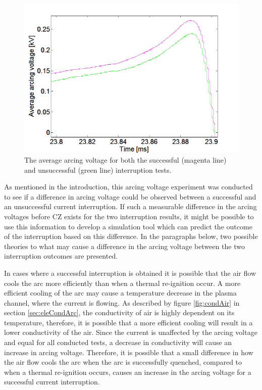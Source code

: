 \documentclass[10pt,b5paper,twoside]{article}
\begin{document}
\begin{figure}[H]
\centering
\includegraphics[scale=0.6, angle =0 ]{Bilder/Results/ArcingVoltage_18_both_average.PNG}
\caption{The average arcing voltage for both the successful (magenta line) and unsuccessful (green line) interruption tests.} \label{fig:18mm_both_ave}
\end{figure}

As mentioned in the introduction, this arcing voltage experiment was conducted to see if a difference in arcing voltage could be observed between a successful and an unsuccessful current interruption. If such a measurable difference in the arcing voltages before CZ exists for the two interruption results, it might be possible to use this information to develop a simulation tool which can predict the outcome of the interruption based on this difference. In the paragraphs below, two possible theories to what may cause a difference in the arcing voltage between the two interruption outcomes are presented.

In cases where a successful interruption is obtained it is possible that the air flow cools the arc more efficiently than when a thermal re-ignition occur. A more efficient cooling of the arc may cause a temperature decrease in the plasma channel, where the current is flowing. As described by figure \ref{fig:condAir} in section \ref{sec:eleCondArc}, the conductivity of air is highly dependent on its temperature, therefore, it is possible that a more efficient cooling will result in a lower conductivity of the air. Since the current is unaffected by the arcing voltage and equal for all conducted tests, a decrease in conductivity will cause an increase in arcing voltage. Therefore, it is possible that a small difference in how the air flow cools the arc when the arc is successfully quenched, compared to when a thermal re-ignition occurs, causes an increase in the arcing voltage for a successful current interruption.
\end{document}
